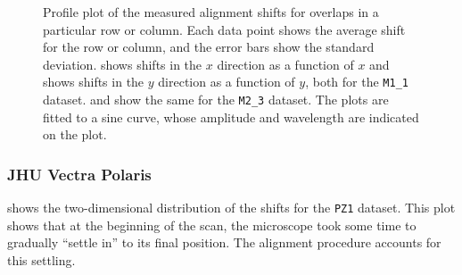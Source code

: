 \documentclass{article}
\newcommand{\M}[2]{\texttt{M#1\_#2}}
\begin{document}
\begin{figure}[ht]
\begin{subfigure}{0.24\linewidth}
	       \caption{}
	       \label{fig:sinewaveyy2}
	\end{subfigure}
	\caption{Profile plot of the measured alignment shifts for overlaps in a particular row or column.  Each data point shows the average shift for the row or column, and the error bars show the standard deviation.   shows shifts in the $x$ direction as a function of $x$ and  shows shifts in the $y$ direction as a function of $y$, both for the \M11 dataset.   and  show the same for the \M23 dataset.  The plots are fitted to a sine curve, whose amplitude and wavelength are indicated on the plot.}
	\label{fig:sinewaves}
       
\end{figure}

\subsubsection{JHU Vectra Polaris}
\label{sec:polaris2D}

 shows the two-dimensional distribution of the shifts for the \texttt{PZ1} dataset.  This plot shows that at the beginning of the scan, the microscope took some time to gradually ``settle in'' to its final position.  The alignment procedure accounts for this settling.
\end{document}
